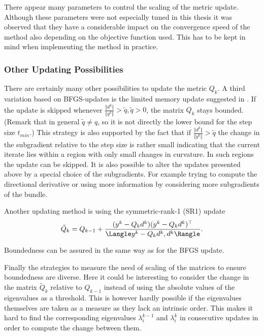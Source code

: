 
\begin{remark}
	There appear many parameters to control the scaling of the metric update. Although these parameters were not especially tuned in this thesis it was observed that they have a considerable impact on the convergence speed of the method also depending on the objective function used. This has to be kept in mind when implementing the method in practice.
\end{remark}

\subsubsection{Other Updating Possibilities}

There are certainly many other possibilities to update the metric \(Q_k\). A third variation based on BFGS-updates is the limited memory update suggested in \cite{Nocedal1980}. If the update is skipped whenever \(\frac{\Vert d^k\Vert}{\Vert y^k\Vert}> \tilde{q}, \tilde{q}>0\), the matrix \(Q_k\) stays bounded. (Remark that in general \(\tilde{q}\neq q\), so it is not directly the lower bound for the step size \(t_{min}\).) This strategy is also supported by the fact that if \(\frac{\Vert d^k\Vert}{\Vert y^k\Vert}> \tilde{q}\) the change in the subgradient relative to the step size
is rather small indicating that the current iterate lies within a region with only small changes in curvature. In such regions the update can be skipped.
It is also possible to alter the updates presented above by a special choice of the subgradients. For example trying to compute the directional derivative or using more information by considering more subgradients of the bundle.
 
Another updating method is using the symmetric-rank-1 (SR1) update
\[ \tilde{Q}_k = Q_{k-1}+\frac{(y^k-Q_kd^k)(y^k-Q_kd^k)^{\top}}{\Langle y^k-Q_kd^k,d^k \Rangle}. \]

Boundedness can be assured in the same way as for the BFGS update.

Finally the strategies to measure the need of scaling of the matrices to ensure boundedness are diverse. Here it could be interesting to consider the change in the matrix \(\tilde{Q}_k\) relative to \(Q_{k-1}\) instead of using the absolute values of the eigenvalues as a threshold.
This is however hardly possible if the eigenvalues themselves are taken as a measure as they lack an intrinsic order. This makes it hard to find the corresponding eigenvalues \(\lambda^{k-1}_i\) and \(\lambda^k_i\) in consecutive updates in order to compute the change between them.

